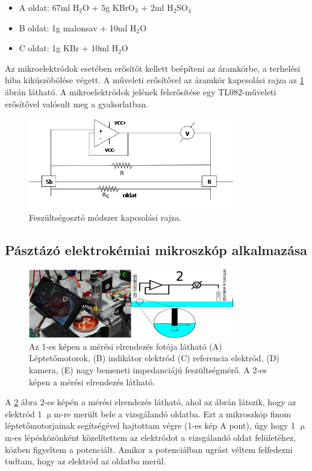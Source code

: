 \begin{itemize} \label{komponensek}
\item A oldat: 67ml H$_2$O + 5g KBrO$_3$ + 2ml H$_2$SO$_4$
\item B oldat: 1g malonsav + 10ml H$_2$O
\item C oldat: 1g KBr + 10ml H$_2$O
\end{itemize}

Az mikroelektródok esetében erősítőt kellett beépíteni az áramkörbe, a terhelési hiba kiküszöbölése végett. A műveleti erősítővel az áramkör kapcsolási rajza az \ref{fig:erosito} ábrán látható. A mikroelektródok jelének felerősítése egy TL082-műveleti erősítővel valósult meg a gyakorlatban.
\begin{figure}[h!]
\centering
\includegraphics[width=0.8\textwidth]{img/erosito2.png}
\caption{Feszültségosztó módszer kapcsolási rajza.}
\label{fig:erosito}
\end{figure}

\subsection{Pásztázó elektrokémiai mikroszkóp alkalmazása}

\begin{figure}[h]
\centering
\includegraphics[width=0.8\textwidth]{img/secm.png}
\caption{Az 1-es képen a mérési elrendezés fotója látható (A) Léptetőmotorok, (B) indikátor elektród (C) referencia elektród, (D) kamera, (E) nagy bemeneti impedanciájú feszültségmérő. A 2-es képen a mérési elrendezés látható.}
\label{fig:secm}
\end{figure}

A \ref{fig:secm} ábra 2-es képén a mérési elrendezés látható, ahol az ábrán látszik, hogy az elektród 1 $\upmu$m-re merült bele a vizsgálandó oldatba. Ezt a mikroszkóp finom léptetőmotorjainak segítségével hajtottam végre (1-es kép A pont), úgy hogy 1 $\upmu$m-es lépésközönként közelítettem az elektródot a vizsgálandó oldat felületéhez, közben figyeltem a potenciált. Amikor a potenciálban ugrást véltem felfedezni tudtam, hogy az elektród az oldatba merül.


